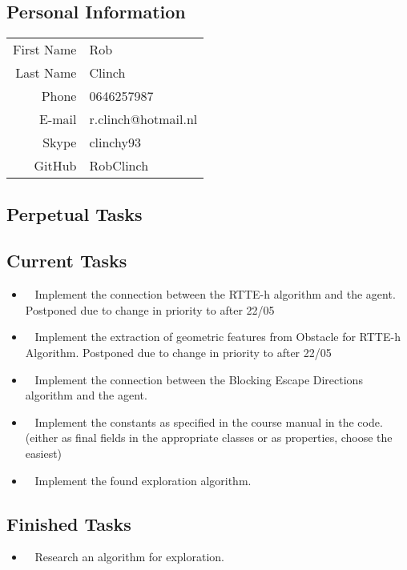 \subsection{Personal Information}
\begin{table}[h!]
	\begin{tabular}{rl}
		First Name 	& Rob\\
		Last Name	& Clinch\\
		Phone		& 0646257987\\
		E-mail		& r.clinch@hotmail.nl\\
		Skype		& clinchy93\\
		GitHub		& RobClinch
	\end{tabular}
\end{table}

\subsection{Perpetual Tasks}

\subsection{Current Tasks}
\begin{itemize}
	\item~
	Implement the connection between the RTTE-h algorithm and the agent.
		\subitem Postponed due to change in priority to after 22/05
	\item~
	Implement the extraction of geometric features from Obstacle for RTTE-h Algorithm.
		\subitem Postponed due to change in priority to after 22/05
	\item~
		Implement the connection between the Blocking Escape Directions algorithm and the agent.
	\item~
		Implement the constants as specified in the course manual in the code. (either as final fields in the appropriate classes or as properties, choose the easiest)
	\item~
		Implement the found exploration algorithm.
\end{itemize}

\subsection{Finished Tasks}
\begin{itemize}
\item~
		Research an algorithm for exploration.
\end{itemize}
